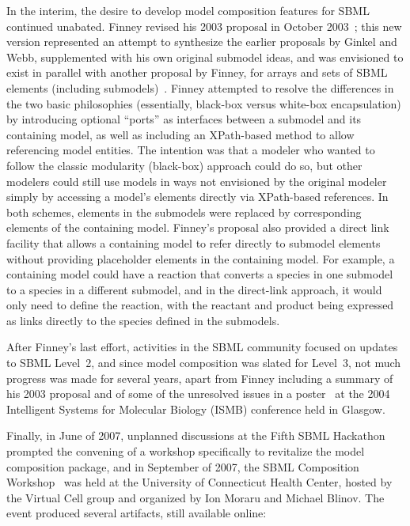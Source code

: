 In the interim, the desire to develop model composition features for
SBML continued unabated.  Finney revised his 2003 proposal in October
2003~\cite{finney:2003b}; this new version represented an attempt to synthesize the
earlier proposals by Ginkel and Webb, supplemented with his own original
submodel ideas, and was envisioned to exist in parallel with another
proposal by Finney, for arrays and sets of SBML elements (including
submodels)~\citep{finney:2003c}.  Finney attempted to resolve the differences in the
two basic philosophies (essentially, black-box versus white-box
encapsulation) by introducing optional ``ports'' as interfaces between a
submodel and its containing model, as well as including an XPath-based
method to allow referencing model entities.  The intention was that a
modeler who wanted to follow the classic modularity (black-box) approach
could do so, but other modelers could still use models in ways not
envisioned by the original modeler simply by accessing a model's
elements directly via XPath-based references.  In both schemes, elements
in the submodels were replaced by corresponding elements of the
containing model.  Finney's proposal also provided a direct link
facility that allows a containing model to refer directly to submodel
elements without providing placeholder elements in the containing
model.  For example, a containing model could have a reaction that
converts a species in one submodel to a species in a different submodel,
and in the direct-link approach, it would only need to define the
reaction, with the reactant and product being expressed as links
directly to the species defined in the submodels.

After Finney's last effort, activities in the SBML community focused on
updates to SBML Level~2, and since model composition was slated for
Level~3, not much progress was made for several years, apart from Finney
including a summary of his 2003 proposal and of some of the unresolved
issues in a poster~\citep{finney:2004} at the 2004 Intelligent Systems for Molecular
Biology (ISMB) conference held in Glasgow.

Finally, in June of 2007, unplanned discussions at the Fifth SBML
Hackathon~\citep{sbml5} prompted the convening of a workshop
specifically to revitalize the model composition package, and in
September of 2007, the SBML Composition Workshop~\citep{comp2007} was
held at the University of Connecticut Health Center, hosted by the
Virtual Cell group and organized by Ion Moraru and Michael Blinov.  The
event produced several artifacts, still available online:

